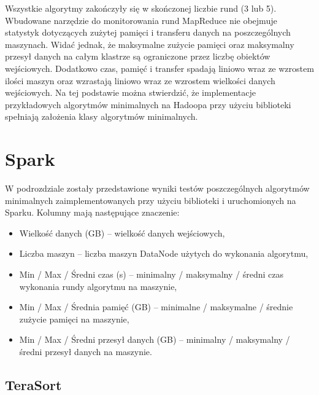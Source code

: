 \documentclass[magisterska]{pracamgr}
\begin{document}
Wszystkie algorytmy zakończyły się w skończonej liczbie rund (3 lub 5). Wbudowane narzędzie do monitorowania rund MapReduce nie obejmuje statystyk dotyczących zużytej pamięci i transferu danych na poszczególnych maszynach. Widać jednak, że maksymalne zużycie pamięci oraz maksymalny przesył danych na całym klastrze są ograniczone przez liczbę obiektów wejściowych. Dodatkowo czas, pamięć i transfer spadają liniowo wraz ze wzrostem ilości maszyn oraz wzrastają liniowo wraz ze wzrostem wielkości danych wejściowych. Na tej podstawie można stwierdzić, że implementacje przykładowych algorytmów minimalnych na Hadoopa przy użyciu biblioteki spełniają założenia klasy algorytmów minimalnych.

\section{Spark}

W podrozdziale zostały przedstawione wyniki testów poszczególnych algorytmów minimalnych zaimplementowanych przy użyciu biblioteki i uruchomionych na Sparku. Kolumny mają następujące znaczenie:
\begin{itemize}
    \item Wielkość danych (GB) -- wielkość danych wejściowych,
    \item Liczba maszyn -- liczba maszyn DataNode użytych do wykonania algorytmu,
    \item Min / Max / Średni czas (s) -- minimalny / maksymalny / średni czas wykonania rundy algorytmu na maszynie,
    \item Min / Max / Średnia pamięć (GB) -- minimalne / maksymalne / średnie zużycie pamięci na maszynie,
    \item Min / Max / Średni przesył danych (GB) -- minimalny / maksymalny / średni przesył danych na maszynie.
\end{itemize}

\subsection{TeraSort}
\end{document}
